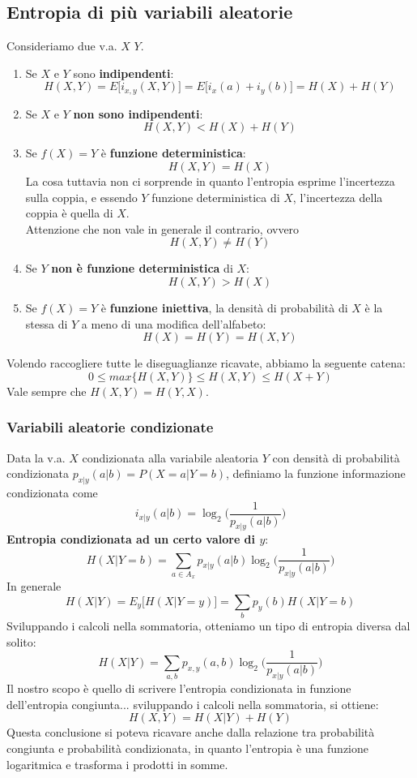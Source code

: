 \documentclass{article}
\begin{document}
\subsection{Entropia di più variabili aleatorie}
Consideriamo due v.a. ${X}$ ${Y}$.\\
\begin{enumerate}
	\item Se ${X}$ e ${Y}$ sono \textbf{indipendenti}: $$H({X},{Y})=E\big[i_{x,y}({X},{Y})\big]=E\big[i_x(a)+i_y(b)\big]=H({X})+H({Y})$$
	\item Se ${X}$ e ${Y}$ \textbf{non sono indipendenti}: $$H({X},{Y})<H({X})+H({Y})$$
	\item Se $f({X})={Y}$ è \textbf{funzione deterministica}: $$H({X}, {Y})=H({X})$$
	La cosa tuttavia non ci sorprende in quanto l'entropia esprime l'incertezza sulla coppia, e essendo ${Y}$ funzione deterministica di ${X}$, l'incertezza della coppia è quella di ${X}$.\\
	Attenzione che non vale in generale il contrario, ovvero $$H({X},{Y})\neq H({Y})$$
	\item Se ${Y}$ \textbf{non è funzione deterministica} di ${X}$: $$H({X},{Y})>H({X})$$	
	\item Se $f({X})={Y}$ è \textbf{funzione iniettiva}, la densità di probabilità di ${X}$ è la stessa di ${Y}$ a meno di una modifica dell'alfabeto: $$H({X})=H({Y})=H({X},{Y})$$
\end{enumerate}
Volendo raccogliere tutte le diseguaglianze ricavate, abbiamo la seguente catena:
$$0\leq max\{H({X},{Y})\}\leq H({X},{Y})\leq H({X}+{Y})$$
Vale sempre che $H({X},{Y})=H({Y},{X})$.\\

\subsubsection{Variabili aleatorie condizionate}
Data la v.a. $X$ condizionata alla variabile aleatoria $Y$ con densità di probabilità condizionata $p_{x|y}(a|b)=P(X=a|Y=b)$, definiamo la funzione informazione condizionata come
$$i_{x|y}(a|b)=\log_2\big(\frac{1}{p_{x|y}(a|b)}\big)$$
\textbf{Entropia condizionata ad un certo valore di $y$}: $$H(X|Y=b)=\sum_{a\in A_x}p_{x|y}(a|b)\log_2\big(\frac{1}{p_{x|y}(a|b)}\big)$$
In generale
$$H(X|Y)=E_y\big[H(X|Y=y)\big]=\sum_bp_y(b)H(X|Y=b)$$
Sviluppando i calcoli nella sommatoria, otteniamo un tipo di entropia diversa dal solito:
$$H(X|Y)=\sum_{a,b}p_{x,y}(a,b)\log_2\big(\frac{1}{p_{x|y}(a|b)}\big)$$
Il nostro scopo è quello di scrivere l'entropia condizionata in funzione dell'entropia congiunta... sviluppando i calcoli nella sommatoria, si ottiene:
$$H(X,Y)=H(X|Y)+H(Y)$$
Questa conclusione si poteva ricavare anche dalla relazione tra probabilità congiunta e probabilità condizionata, in quanto l'entropia è una funzione logaritmica e trasforma i prodotti in somme.
\end{document}
